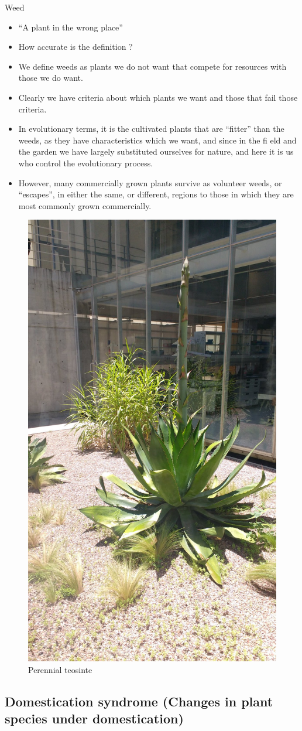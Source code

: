 \documentclass[
  ignorenonframetext,
  aspectratio=169]{beamer}
\providecommand{\tightlist}{%
  \setlength{\itemsep}{0pt}\setlength{\parskip}{0pt}}
\begin{document}
\begin{frame}{Weed}
\protect\hypertarget{weed}{}
\begin{itemize}
\tightlist
\item
  ``A plant in the wrong place''
\item
  How accurate is the definition ?
\item
  We define weeds as plants we do not want that compete for resources
  with those we do want.
\item
  Clearly we have criteria about which plants we want and those that
  fail those criteria.
\item
  In evolutionary terms, it is the cultivated plants that are ``fitter''
  than the weeds, as they have characteristics which we want, and since
  in the fi eld and the garden we have largely substituted ourselves for
  nature, and here it is us who control the evolutionary process.
\item
  However, many commercially grown plants survive as volunteer weeds, or
  ``escapes'', in either the same, or different, regions to those in
  which they are most commonly grown commercially.
\end{itemize}
\end{frame}

\begin{frame}{}
\protect\hypertarget{section-5}{}
\begin{figure}

{\centering \includegraphics[width=0.26\linewidth]{./../images/Perennial_teosinte} 

}

\caption{Perennial teosinte}\label{fig:weed-vs-crop}
\end{figure}
\end{frame}

\hypertarget{domestication-syndrome-changes-in-plant-species-under-domestication}{%
\subsection{Domestication syndrome (Changes in plant species under
domestication)}\label{domestication-syndrome-changes-in-plant-species-under-domestication}}
\end{document}

